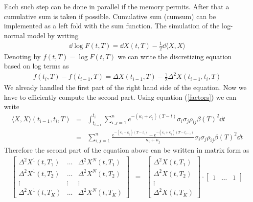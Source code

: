 \documentclass[12pt]{article}
\begin{document}
%
Each such step can be done in parallel if the memory permits. After that a cumulative sum is taken if possible. Cumulative sum (cumsum) can be implemented as a left fold with the sum function. 
% 
The simulation of the log-normal model by writing 
\begin {eqnarray*}
  \dd \log F(t,T) = \dd X(t,T) - \frac 1 2 \dd \langle X, X \rangle 
\end {eqnarray*}
Denoting by  $ f(t,T) = \log F(t,T) $ we can write the discretizing equation 
based on log terms as 
\begin {eqnarray*}
  f(t_i,T) - f(t_{i-1},T) = \Delta X(t_{i-1},T) - \frac 1 2 \Delta ^2 X(t_{i-1},t_i, T)
\end {eqnarray*}
We already handled the first part of the right hand side of the equation. 
Now we have to efficiently compute the second part. Using equation 
(\ref{factors}) we can write 
\begin {eqnarray*}
  \langle X, X \rangle (t_{i-1},t_i,T) & = & \int_{t_{i-1}}^{t_i}
  \sum_{i,j=1}^n e^{- (\kappa_i + \kappa_j ) (T - t) } 
  \sigma_i \sigma_j \rho_{ij} \beta (T)^2 \dd t
  \\
  & = & \sum_{i,j=1}^n \frac { e^{- (\kappa_i + \kappa_j ) (T - t_i)} - e^{- (\kappa_i + \kappa_j ) (T - t_{i-1})} } { \kappa_i + \kappa_j } 
  \sigma_i \sigma_j \rho_{ij} \beta (T)^2 \dd t
\end {eqnarray*}
Therefore the second part of the equation above can be written in matrix 
form as 
\begin {eqnarray*}
  \left[ 
    \begin {array} {ccc}
      \Delta ^2 X^1 (t,T_1) & \ldots & \Delta ^2 X^N (t,T_1)
      \\
      \Delta ^2 X^1 (t,T_2) & \ldots & \Delta ^2 X^N (t,T_2)
      \\
      \vdots & \vdots & \vdots 
      \\
      \Delta ^2 X^1 (t,T_K) & \ldots & \Delta ^2 X^N (t,T_K)
    \end {array}
    \right]
  & = &
  \left[ 
    \begin {array} {c}
      \Delta ^2 X (t,T_1) 
      \\
      \Delta ^2 X (t,T_2)
      \\
      \vdots 
      \\
      \Delta ^2 X (t,T_K) 
    \end {array}
    \right]
  \cdot 
  \left[ \begin {array} {ccc} 
      1 & \ldots & 1 
    \end {array}
    \right]
\end {eqnarray*}
\end{document}
